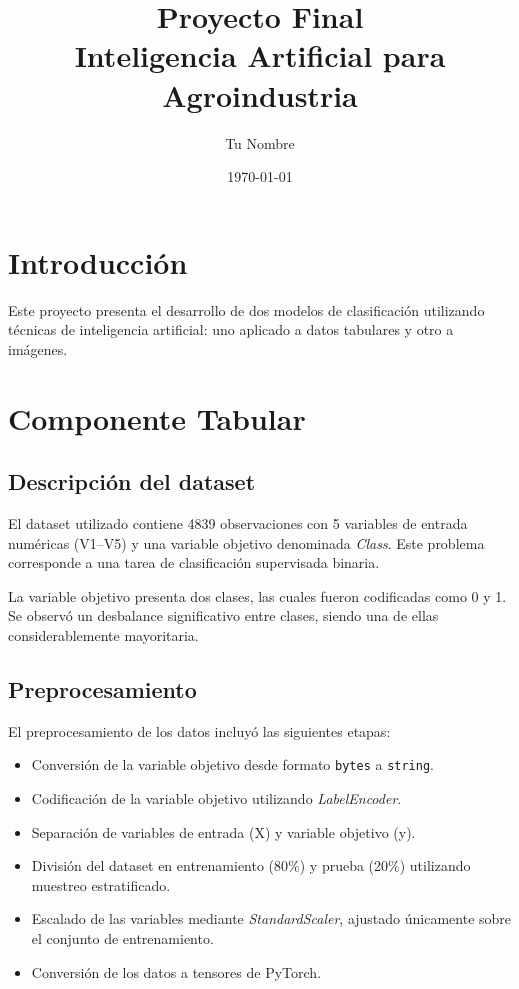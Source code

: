 \documentclass{article}
\title{Proyecto Final \\ Inteligencia Artificial para Agroindustria}
\author{Tu Nombre}
\date{\today}
\begin{document}
\maketitle

\section{Introducción}

Este proyecto presenta el desarrollo de dos modelos de clasificación utilizando técnicas de inteligencia artificial: uno aplicado a datos tabulares y otro a imágenes.

\section{Componente Tabular}

\subsection{Descripción del dataset}

El dataset utilizado contiene 4839 observaciones con 5 variables de entrada numéricas (V1–V5) y una variable objetivo denominada \textit{Class}. Este problema corresponde a una tarea de clasificación supervisada binaria.

La variable objetivo presenta dos clases, las cuales fueron codificadas como 0 y 1. Se observó un desbalance significativo entre clases, siendo una de ellas considerablemente mayoritaria.

\subsection{Preprocesamiento}

El preprocesamiento de los datos incluyó las siguientes etapas:

\begin{itemize}
    \item Conversión de la variable objetivo desde formato \texttt{bytes} a \texttt{string}.
    \item Codificación de la variable objetivo utilizando \textit{LabelEncoder}.
    \item Separación de variables de entrada (X) y variable objetivo (y).
    \item División del dataset en entrenamiento (80\%) y prueba (20\%) utilizando muestreo estratificado.
    \item Escalado de las variables mediante \textit{StandardScaler}, ajustado únicamente sobre el conjunto de entrenamiento.
    \item Conversión de los datos a tensores de PyTorch.
\end{itemize}
\end{document}
